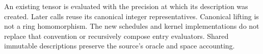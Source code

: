 \begin{remark}
An existing tensor is evaluated with the precision at which its description
was created. Later calls reuse its canonical integer representatives.
Canonical lifting is not a ring homomorphism. The new schedules and kernel
implementations do not replace that convention or recursively compose entry
evaluators. Shared immutable descriptions preserve the source's oracle and
space accounting.
\end{remark}
